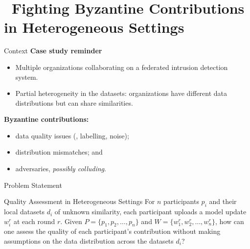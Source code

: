 
\setlength{\titleoffset}{-1.05cm}
\section
  [{\texttt{RADAR}~\circled[contrib/radar]{R}}]
  {~Fighting Byzantine Contributions in Heterogeneous Settings}


\begin{frame}[plain]
  \sectionpage

\end{frame}


\begin{frame}{Context}
  \textbf{Case study reminder}
  \begin{itemize}
    \item Multiple organizations collaborating on a federated intrusion detection system.
    \item Partial heterogeneity in the datasets: organizations have different data distributions but can share similarities.
  \end{itemize}

  \textbf{Byzantine contributions:}
  \begin{itemize}
    \item data quality issues (\eg, labelling, noise);
    \item distribution mismatches; and
    \item adversaries, \textit{possibly colluding}.

  \end{itemize}

\end{frame}

\begin{frame}{Problem Statement}
  \begin{block}{Quality Assessment in Heterogeneous Settings}
    For $n$ participants $p_i$ and their local datasets $d_i$ of unknown similarity, each participant uploads a model update $w_i^r$ at each round $r$. Given $P = \{ p_1, p_2, \dots, p_n \} $ and $W = \{ w_1^r, w_2^r, \dots, w_n^r \} $, how can one assess the quality of each participant’s contribution without making assumptions on the data distribution across the datasets $d_i$?
  \end{block}
\end{frame}


